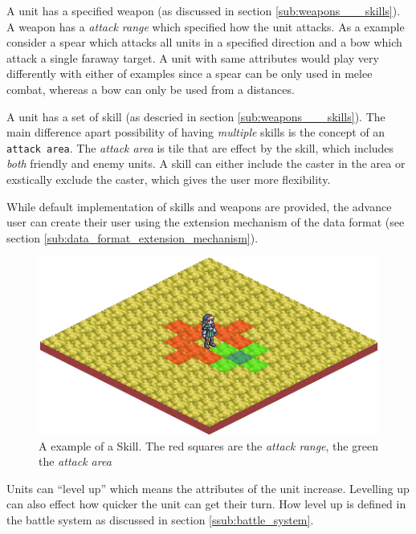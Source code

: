 A unit has a  specified weapon (as discussed in section \ref{sub:weapons___skills}).  A weapon has a \emph{attack range} which specified how the unit attacks.  As a example consider a spear which attacks all units in a specified direction and a bow which attack a single faraway target. A unit with same attributes would play very differently with either of examples since a spear can be only used in melee combat, whereas a bow can only be used from a distances.

A unit has a set of skill (as descried in section \ref{sub:weapons___skills}). The main difference apart possibility of having \emph{multiple} skills is the concept of an \texttt{attack area}.  The \emph{attack area} is tile that are effect by the skill, which includes \emph{both} friendly and enemy units. A skill can either include the caster in the area or exstically exclude the caster, which gives the user more flexibility.

While default implementation of skills and weapons are provided, the advance user can create their user using the extension mechanism of the data format (see section \ref{sub:data_format_extension_mechanism}).

\begin{figure}[htbp]
	\centering
 		\includegraphics[scale=0.5]{figures/skill.png}
	\caption{A example of a Skill. The red squares are the \emph{attack range}, the green the \emph{attack area}}
	\label{fig:figures_engine_Skills}
\end{figure}

Units can ``level up'' which means the attributes  of the unit increase.  Levelling up can also effect how quicker the unit can get their turn. How level up is defined in the battle system as discussed in section \ref{ssub:battle_system}.


